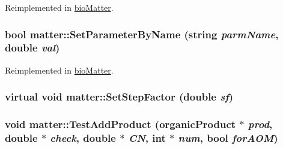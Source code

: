 Reimplemented in \hyperlink{classbio_matter_adfb5f616faed3698fa71b8a29b091014}{bioMatter}.\hypertarget{classmatter_a4476cba25191cb4f52471675ae270c04}{
\subsubsection[{SetParameterByName}]{\setlength{\rightskip}{0pt plus 5cm}bool matter::SetParameterByName (string {\em parmName}, \/  double {\em val})}}
\label{classmatter_a4476cba25191cb4f52471675ae270c04}


Reimplemented in \hyperlink{classbio_matter_a1ade505ad2c176aedbcf4b3e937eb412}{bioMatter}.\hypertarget{classmatter_a850135c585ac81915cac266f0d8e04df}{
\subsubsection[{SetStepFactor}]{\setlength{\rightskip}{0pt plus 5cm}virtual void matter::SetStepFactor (double {\em sf})}}
\label{classmatter_a850135c585ac81915cac266f0d8e04df}
\hypertarget{classmatter_ac17664d421545b45ef91061b17ae6c7b}{
\subsubsection[{TestAddProduct}]{\setlength{\rightskip}{0pt plus 5cm}void matter::TestAddProduct ({\bf organicProduct} $\ast$ {\em prod}, \/  double $\ast$ {\em check}, \/  double $\ast$ {\em CN}, \/  int $\ast$ {\em num}, \/  bool {\em forAOM})}}
\label{classmatter_ac17664d421545b45ef91061b17ae6c7b}


